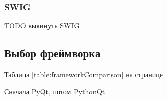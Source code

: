 \documentclass[14pt]{matmex-diploma-custom}
\begin{document}
\subsubsection{SWIG}
TODO выкинуть SWIG

\subsection{Выбор фреймворка}

Таблица \ref{table:frameworkComparison} на странице \pageref{table:frameworkComparison}

Сначала PyQt, потом PythonQt

\end{document}
